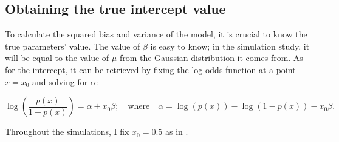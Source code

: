 \subsection{Obtaining the true intercept value}

To calculate the squared bias and variance of the model, it is crucial to know the true parameters' value. The value of $\beta$ is easy to know; in the simulation study, it will be equal to the value of $\mu$ from the Gaussian distribution it comes from. As for the intercept, it can be retrieved by fixing the log-odds function at a point $x=x_0$ and solving for $\alpha$:

\begin{equation}
    \nonumber \log \left(\frac{p(x)}{1-p(x)}\right) =  \alpha + x_0 \beta; \quad \text{where}  \quad
    \alpha = \log(p(x)) - \log(1 - p(x)) - x_0  \beta.
\end{equation}

Throughout the simulations, I fix $x_0=0.5$ as in \textcite{wang2020rare}. 